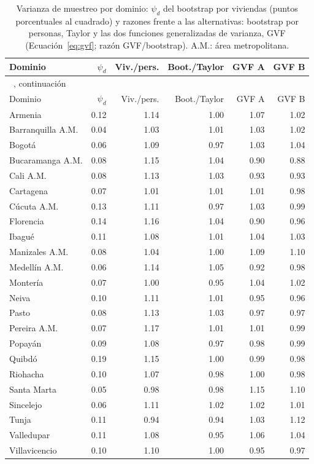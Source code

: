 {\footnotesize\setlength{\tabcolsep}{3pt}
\begin{longtable}{l r r r r r}
\caption[Varianza de muestreo por dominio]{Varianza de muestreo por dominio: $\psi_d$ del bootstrap por viviendas (puntos porcentuales al cuadrado) y razones frente a las alternativas: bootstrap por personas, Taylor y las dos funciones generalizadas de varianza, GVF (Ecuación~\ref{eq:gvf}; razón GVF/bootstrap). A.M.: área metropolitana.}
\label{tab:app_varianza} \\
\toprule
Dominio & $\psi_d$ & Viv./pers. & Boot./Taylor & GVF A & GVF B \\
\midrule
\endfirsthead
\multicolumn{6}{l}{\tablename~\thetable{}, continuación} \\
\toprule
Dominio & $\psi_d$ & Viv./pers. & Boot./Taylor & GVF A & GVF B \\
\midrule
\endhead
\bottomrule
\endlastfoot
Armenia & 0.12 & 1.14 & 1.00 & 1.07 & 1.02 \\
Barranquilla A.M. & 0.04 & 1.03 & 1.01 & 1.03 & 1.02 \\
Bogotá & 0.06 & 1.09 & 0.97 & 1.03 & 1.04 \\
Bucaramanga A.M. & 0.08 & 1.15 & 1.04 & 0.90 & 0.88 \\
Cali A.M. & 0.08 & 1.13 & 1.03 & 0.93 & 0.93 \\
Cartagena & 0.07 & 1.01 & 1.01 & 1.01 & 0.98 \\
Cúcuta A.M. & 0.13 & 1.11 & 0.97 & 1.03 & 0.99 \\
Florencia & 0.14 & 1.16 & 1.04 & 0.90 & 0.96 \\
Ibagué & 0.11 & 1.08 & 1.01 & 1.04 & 1.03 \\
Manizales A.M. & 0.08 & 1.04 & 1.00 & 1.09 & 1.10 \\
Medellín A.M. & 0.06 & 1.14 & 1.05 & 0.92 & 0.98 \\
Montería & 0.07 & 1.00 & 0.95 & 1.04 & 1.02 \\
Neiva & 0.10 & 1.11 & 1.01 & 0.95 & 0.96 \\
Pasto & 0.08 & 1.13 & 1.03 & 0.97 & 0.97 \\
Pereira A.M. & 0.07 & 1.17 & 1.01 & 1.01 & 0.99 \\
Popayán & 0.09 & 1.08 & 0.97 & 0.98 & 0.99 \\
Quibdó & 0.19 & 1.15 & 1.00 & 0.99 & 0.98 \\
Riohacha & 0.10 & 1.07 & 0.98 & 1.00 & 0.98 \\
Santa Marta & 0.05 & 0.98 & 0.98 & 1.15 & 1.10 \\
Sincelejo & 0.06 & 1.11 & 1.02 & 1.02 & 1.01 \\
Tunja & 0.11 & 0.94 & 0.94 & 1.03 & 1.12 \\
Valledupar & 0.11 & 1.08 & 0.95 & 1.06 & 1.04 \\
Villavicencio & 0.10 & 1.10 & 1.00 & 0.95 & 0.97 \\
\end{longtable}
}
